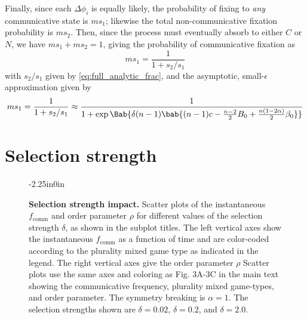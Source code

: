 \documentclass[10pt,letterpaper]{article}
\begin{document}
Finally, since each $\Delta \phi_i$ is equally likely,
the probability of fixing to \emph{any}
communicative state is $m s_1$;
likewise the total non-communicative fixation probability is $m s_2$.
Then, since the process must eventually absorb to either $C$ or $N$,
we have
$m s_1 + m s_2 = 1$, giving the probability of communicative fixation as
\begin{equation}
  m s_1 = \frac{1}{1 + s_2/s_1}
  \label{eq:full_analytic}
\end{equation}
with $s_2/s_1$ given by \cref{eq:full_analytic_frac},
and the asymptotic, small-$\epsilon$ approximation given by
\begin{equation}
  m s_1 = \frac{1}{1 + s_2/s_1}
  \approx
  \frac{1}
  {1 + \exp \Bab{\delta (n-1) \bab{
    (n-1) c
    - \frac{n-2}{2} B_0
    +
    \frac{n (1 - 2 \alpha)}{2} \beta_0
    }}
  }
  \label{eq:analytic_first_term}
\end{equation}

\section{Selection strength}
\begin{figure}
\begin{adjustwidth}{-2.25in}{0in}
  \centering
  \begin{subcaptiongroup}
		\label{fig:selection_strength-002}%
		\label{fig:selection_strength-02}%
		\label{fig:selection_strength-2}%
  \end{subcaptiongroup}
  \caption{
    \textbf{
			Selection strength impact.
    }
    Scatter plots of the instantaneous $f_{\text{comm}}$
		and order parameter $\rho$ for different values of the selection
		strength $\delta$, as shown in the subplot titles.
    The left vertical axes show the instantaneous $f_{\text{comm}}$
    as a function of time and are color-coded according
    to the plurality mixed game type as indicated in the legend.
    The right vertical axes give the order parameter $\rho$
    Scatter plots use the same axes and coloring as Fig. 3A-3C in the main text
    showing the communicative frequency, plurality mixed game-types, and order parameter.
		The symmetry breaking is $\alpha = 1$.
		The selection strengths shown are
		$\delta = 0.02$,
		$\delta = 0.2$,
		and
		$\delta = 2.0$.
  }\label{fig:selection-strength}
\end{adjustwidth}
\end{figure}
\end{document}
